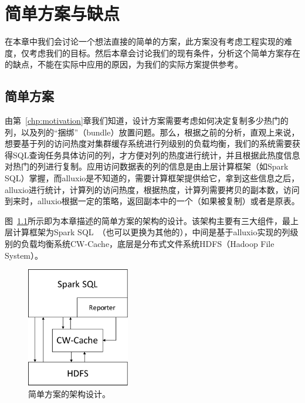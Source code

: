 \chapter{简单方案与缺点}

\par 在本章中我们会讨论一个想法直接的简单的方案，此方案没有考虑工程实现的难度，仅考虑我们的目标。然后本章会讨论我们的现有条件，分析这个简单方案存在的缺点，不能在实际中应用的原因，为我们的实际方案提供参考。

\section{简单方案}

\par 由第~\ref{chp:motivation}章我们知道，设计方案需要考虑如何决定复制多少热门的列，以及列的“捆绑”（bundle）放置问题。那么，根据之前的分析，直观上来说，想要基于列的访问热度对集群缓存系统进行列级别的负载均衡，我们的系统需要获得SQL查询任务具体访问的列，才方便对列的热度进行统计，并且根据此热度信息对热门的列进行复制。应用访问数据表的列的信息是由上层计算框架（如Spark SQL）掌握，而alluxio是不知道的，需要计算框架提供给它，拿到这些信息之后，alluxio进行统计，计算列的访问热度，根据热度，计算列需要拷贝的副本数，访问到来时，alluxio根据一定的策略，返回副本中的一个（如果被复制）或者是原表。


\par 图~\ref{fig:sim-archi}所示即为本章描述的简单方案的架构的设计。该架构主要有三大组件，最上层计算框架为Spark SQL~\cite{spark-sql}（也可以更换为其他的），中间是基于alluxio\cite{alluxio}实现的列级别的负载均衡系统CW-Cache，底层是分布式文件系统HDFS（Hadoop File System）\cite{hdfs}。

\begin{figure}[]
	\centering
	\includegraphics[width=0.4\textwidth]{img/simple-solution/sim-archi}
	
	\caption{简单方案的架构设计。}
	\label{fig:sim-archi}
\end{figure}

